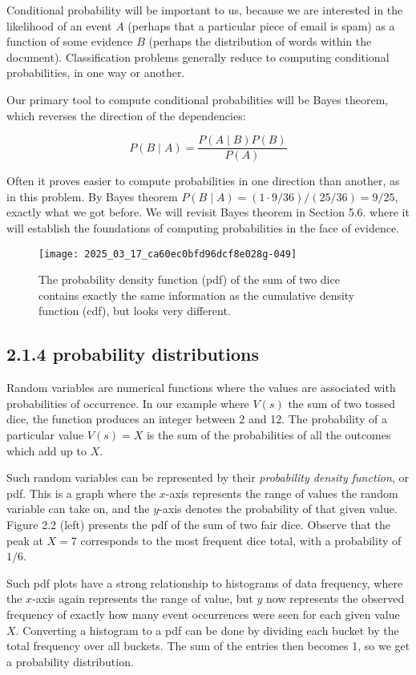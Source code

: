 \documentclass[10pt]{article}
\begin{document}
Conditional probability will be important to us, because we are interested in the likelihood of an event $A$ (perhaps that a particular piece of email is spam) as a function of some evidence $B$ (perhaps the distribution of words within the document). Classification problems generally reduce to computing conditional probabilities, in one way or another.

Our primary tool to compute conditional probabilities will be Bayes theorem, which reverses the direction of the dependencies:

\[
P(B \mid A)=\frac{P(A \mid B) P(B)}{P(A)}
\]

Often it proves easier to compute probabilities in one direction than another, as in this problem. By Bayes theorem \(P(B \mid A)=(1 \cdot 9 / 36) /(25 / 36)=9 / 25\), exactly what we got before. We will revisit Bayes theorem in Section 5.6. where it will establish the foundations of computing probabilities in the face of evidence.

\begin{figure}[h]
  \centering
  \texttt{[image: 2025\_03\_17\_ca60ec0bfd96dcf8e028g-049]}
  \caption{The probability density function (pdf) of the sum of two dice contains exactly the same information as the cumulative density function (cdf), but looks very different.}
\end{figure}

\subsection*{2.1.4 probability distributions}
Random variables are numerical functions where the values are associated with probabilities of occurrence. In our example where \(V(s)\) the sum of two tossed dice, the function produces an integer between 2 and 12. The probability of a particular value \(V(s)=X\) is the sum of the probabilities of all the outcomes which add up to \(X\).

Such random variables can be represented by their \textit{probability density function}, or pdf. This is a graph where the \(x\)-axis represents the range of values the random variable can take on, and the \(y\)-axis denotes the probability of that given value. Figure 2.2 (left) presents the pdf of the sum of two fair dice. Observe that the peak at \(X=7\) corresponds to the most frequent dice total, with a probability of \(1 / 6\).

Such pdf plots have a strong relationship to histograms of data frequency, where the \(x\)-axis again represents the range of value, but \(y\) now represents the observed frequency of exactly how many event occurrences were seen for each given value \(X\). Converting a histogram to a pdf can be done by dividing each bucket by the total frequency over all buckets. The sum of the entries then becomes 1, so we get a probability distribution.
\end{document}
